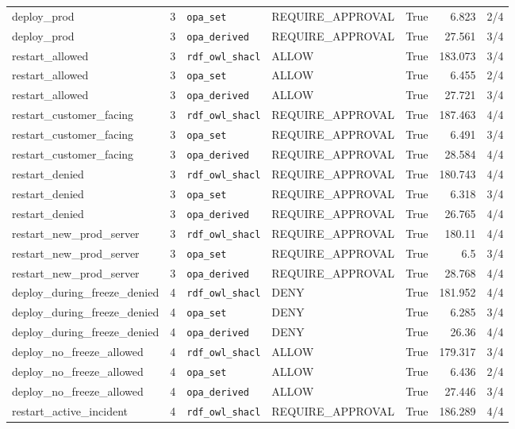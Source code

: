 \begin{table}[h!]
\begin{tabular}{l c l l c r c}
deploy\_prod & 3 & \texttt{opa\_set} & REQUIRE_APPROVAL & True & 6.823 & 2/4 \\
deploy\_prod & 3 & \texttt{opa\_derived} & REQUIRE_APPROVAL & True & 27.561 & 3/4 \\
restart\_allowed & 3 & \texttt{rdf\_owl\_shacl} & ALLOW & True & 183.073 & 3/4 \\
restart\_allowed & 3 & \texttt{opa\_set} & ALLOW & True & 6.455 & 2/4 \\
restart\_allowed & 3 & \texttt{opa\_derived} & ALLOW & True & 27.721 & 3/4 \\
restart\_customer\_facing & 3 & \texttt{rdf\_owl\_shacl} & REQUIRE_APPROVAL & True & 187.463 & 4/4 \\
restart\_customer\_facing & 3 & \texttt{opa\_set} & REQUIRE_APPROVAL & True & 6.491 & 3/4 \\
restart\_customer\_facing & 3 & \texttt{opa\_derived} & REQUIRE_APPROVAL & True & 28.584 & 4/4 \\
restart\_denied & 3 & \texttt{rdf\_owl\_shacl} & REQUIRE_APPROVAL & True & 180.743 & 4/4 \\
restart\_denied & 3 & \texttt{opa\_set} & REQUIRE_APPROVAL & True & 6.318 & 3/4 \\
restart\_denied & 3 & \texttt{opa\_derived} & REQUIRE_APPROVAL & True & 26.765 & 4/4 \\
restart\_new\_prod\_server & 3 & \texttt{rdf\_owl\_shacl} & REQUIRE_APPROVAL & True & 180.11 & 4/4 \\
restart\_new\_prod\_server & 3 & \texttt{opa\_set} & REQUIRE_APPROVAL & True & 6.5 & 3/4 \\
restart\_new\_prod\_server & 3 & \texttt{opa\_derived} & REQUIRE_APPROVAL & True & 28.768 & 4/4 \\
deploy\_during\_freeze\_denied & 4 & \texttt{rdf\_owl\_shacl} & DENY & True & 181.952 & 4/4 \\
deploy\_during\_freeze\_denied & 4 & \texttt{opa\_set} & DENY & True & 6.285 & 3/4 \\
deploy\_during\_freeze\_denied & 4 & \texttt{opa\_derived} & DENY & True & 26.36 & 4/4 \\
deploy\_no\_freeze\_allowed & 4 & \texttt{rdf\_owl\_shacl} & ALLOW & True & 179.317 & 3/4 \\
deploy\_no\_freeze\_allowed & 4 & \texttt{opa\_set} & ALLOW & True & 6.436 & 2/4 \\
deploy\_no\_freeze\_allowed & 4 & \texttt{opa\_derived} & ALLOW & True & 27.446 & 3/4 \\
restart\_active\_incident & 4 & \texttt{rdf\_owl\_shacl} & REQUIRE_APPROVAL & True & 186.289 & 4/4 \\

\end{tabular}
\end{table}
